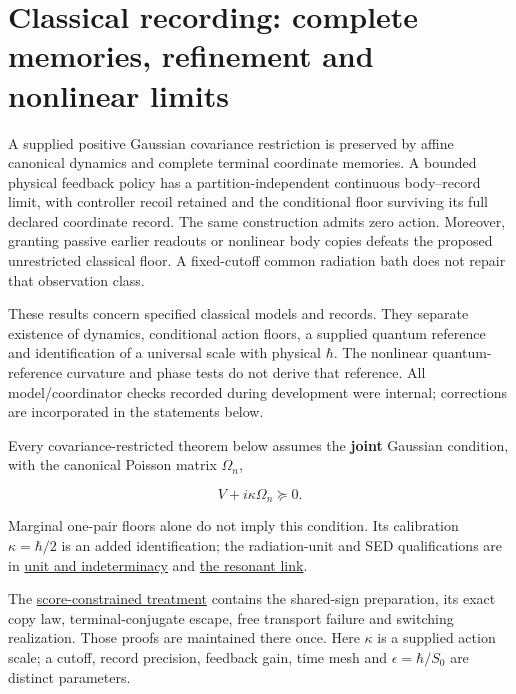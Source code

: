 \documentclass[11pt,a4paper]{article}
\begin{document}
\hypertarget{classical-recording-complete-memories-refinement-and-nonlinear-limits}{%
\section{Classical recording: complete memories, refinement and
nonlinear
limits}\label{classical-recording-complete-memories-refinement-and-nonlinear-limits}}

A supplied positive Gaussian covariance restriction is preserved by
affine canonical dynamics and complete terminal coordinate memories. A
bounded physical feedback policy has a partition-independent continuous
body--record limit, with controller recoil retained and the conditional
floor surviving its full declared coordinate record. The same
construction admits zero action. Moreover, granting passive earlier
readouts or nonlinear body copies defeats the proposed unrestricted
classical floor. A fixed-cutoff common radiation bath does not repair
that observation class.

These results concern specified classical models and records. They
separate existence of dynamics, conditional action floors, a supplied
quantum reference and identification of a universal scale with physical
\(\hbar\). The nonlinear quantum-reference curvature and phase tests do
not derive that reference. All model/coordinator checks recorded during
development were internal; corrections are incorporated in the
statements below.

Every covariance-restricted theorem below assumes the \textbf{joint}
Gaussian condition, with the canonical Poisson matrix \(\Omega_n\),

\[V+i\kappa\Omega_n\succeq0.\tag{22}\]

Marginal one-pair floors alone do not imply this condition. Its
calibration \(\kappa=\hbar/2\) is an added identification; the
radiation-unit and SED qualifications are in
\href{necessity-unit-and-indeterminacy.md}{unit and indeterminacy} and
\href{necessity-unit-and-indeterminacy.md\#lorentz-invariant-spectral-form-and-conditional-planck-calibration}{the
resonant link}.

The \href{score-constrained-ensemble.md}{score-constrained treatment}
contains the shared-sign preparation, its exact copy law,
terminal-conjugate escape, free transport failure and switching
realization. Those proofs are maintained there once. Here \(\kappa\) is
a supplied action scale; a cutoff, record precision, feedback gain, time
mesh and \(\epsilon=\hbar/S_0\) are distinct parameters.
\end{document}
